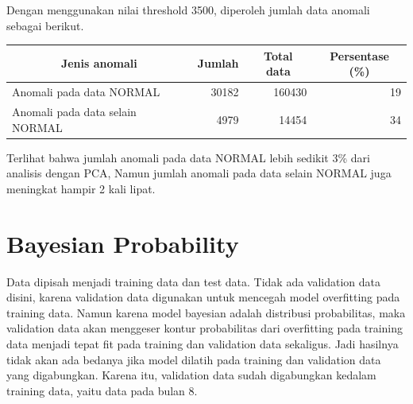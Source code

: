     Dengan menggunakan nilai threshold 3500, diperoleh jumlah data anomali sebagai berikut.

    \begin{table}[h]
        \centering
        \begin{tabular}{|l|r|r|r|}
            \hline
            \multicolumn{1}{|c|}{\textbf{Jenis anomali}} & \multicolumn{1}{c|}{\textbf{Jumlah}} & \multicolumn{1}{c|}{\textbf{Total data}} & \multicolumn{1}{c|}{\textbf{Persentase (\%)}} \\ \hline
            Anomali pada data NORMAL                     & 30182                                & 160430                                   & 19                                       \\ \hline
            Anomali pada data selain NORMAL              & 4979                                 & 14454                                    & 34                                       \\ \hline
        \end{tabular}
    \end{table}

    Terlihat bahwa jumlah anomali pada data NORMAL lebih sedikit 3\% dari analisis dengan PCA, Namun jumlah anomali pada data selain NORMAL juga meningkat hampir 2 kali lipat.

\section{Bayesian Probability}

Data dipisah menjadi training data dan test data. Tidak ada validation data disini, karena validation data digunakan untuk mencegah model overfitting pada training data. Namun karena model bayesian adalah distribusi probabilitas, maka validation data akan menggeser kontur probabilitas dari overfitting pada training data menjadi tepat fit pada training dan validation data sekaligus. Jadi hasilnya tidak akan ada bedanya jika model dilatih pada training dan validation data yang digabungkan. Karena itu, validation data sudah digabungkan kedalam training data, yaitu data pada bulan 8.

